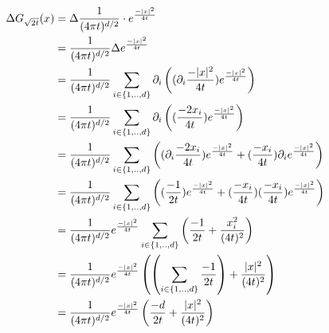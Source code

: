 \documentclass[
 ngerman]{report}
\begin{document}
\begin{minipage}{0.5\linewidth}
  $$ \begin{aligned}
		\Delta G_{\sqrt{2t}} (x) 
		&=\Delta \frac {1} {(4 \pi t)^{d/2}} 
		\cdot e^{ \frac {-|x|^2} {4t}}
		\\
		&= \frac {1} {(4 \pi t)^{d/2}} \Delta  e^{ \frac {-|x|^2} {4t}}
		\\
		&= \frac {1} {(4 \pi t)^{d/2}} \sum_{i\in\left\{1,..,d\right\}} 
		\partial_i\left(
		(\partial_i \frac {-|x|^2} {4t} )e^{ \frac {-|x|^2} {4t}}
		\right)
		\\
		&= \frac {1} {(4 \pi t)^{d/2}} \sum_{i\in\left\{1,..,d\right\}} 
		\partial_i\left(
		(\frac {-2x_i} {4t} )e^{ \frac {-|x|^2} {4t}}
		\right)
		\\
		&= \frac {1} {(4 \pi t)^{d/2}} \sum_{i\in\left\{1,..,d\right\}} 
		\left(
		(\partial_i \frac {-2x_i} {4t} )e^{ \frac {-|x|^2} {4t}}
		+ (\frac {-x_i} {4t} )\partial_ie^{ \frac {-|x|^2} {4t}}
		\right)
		\\
		&= \frac {1} {(4 \pi t)^{d/2}} \sum_{i\in\left\{1,..,d\right\}} 
		\left(
		(\frac {-1} {2t} )e^{ \frac {-|x|^2} {4t}}
		+ (\frac {-x_i} {4t} )
		(\frac {-x_i} {4t} )e^{ \frac {-|x|^2} {4t}}
		\right)
		\\
		&= \frac {1} {(4 \pi t)^{d/2}} e^{ \frac {-|x|^2} {4t}}
		\sum_{i\in\left\{1,..,d\right\}} 
		\left( \frac {-1} {2t} + \frac {x_i^2} {(4t)^2}
		\right) 
		\\
		& = \frac {1} {(4 \pi t)^{d/2}} e^{ \frac {-|x|^2} {4t}}
		\left(\left(\sum_{i\in\left\{1,..,d\right\}} 
		\frac {-1} {2t}\right) + \frac {|x|^2} {(4t)^2}
		\right) 
		\\
		& = \frac {1} {(4 \pi t)^{d/2}} e^{ \frac {-|x|^2} {4t}}
		\left(
		\frac {-d} {2t} + \frac {|x|^2} {(4t)^2}
		\right) 
	\end{aligned}$$
\end{minipage}
\end{document}
